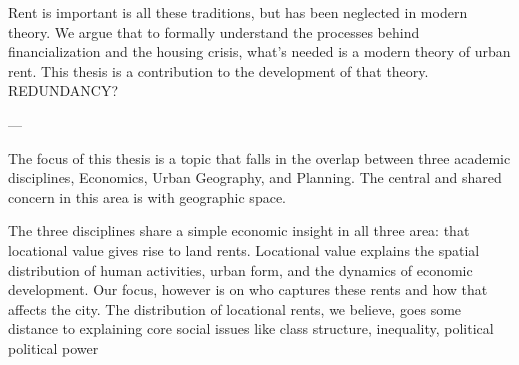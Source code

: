 Rent is important is all these traditions, but has been neglected in modern theory. We argue that to formally understand the processes behind financialization and the housing crisis, what's needed is a modern theory of urban rent. This thesis is a contribution to the development of that theory. REDUNDANCY?

---

The focus of this thesis is a topic that falls in the overlap between three academic  disciplines, Economics, Urban Geography, and Planning. %
The central and shared concern in this area is with geographic space. %



The three disciplines share a simple economic insight in all three area: that locational value gives rise to land rents.  %
Locational value explains the spatial distribution of human activities, urban form,  %
and the dynamics of economic development.  Our focus, however is on who captures these rents and how that affects the city. The distribution of locational rents, we believe, goes some distance to explaining core social issues like class structure, inequality, political political power %


